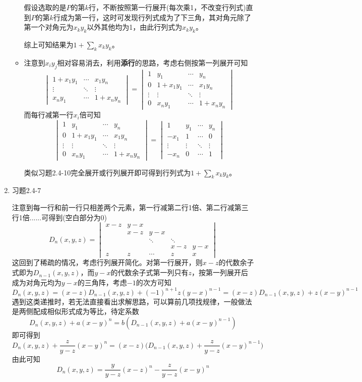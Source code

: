 \documentclass[a4paper,UTF8,fontset=windows]{ctexart}
\begin{document}
\begin{enumerate}
\begin{itemize}
        假设选取的是$P$的第$k$行，不断按照第一行展开(每次乘1，不改变行列式)直到$P$的第$k$行成为第一行，这时可发现行列式成为了下三角，其对角元除了第一个对角元为$x_ky_k$以外其他均为1，由此行列式为$x_ky_k$。

        综上可知结果为$1+\sum_kx_ky_k$。

        \item 注意到$x_iy_j$相对容易消去，利用\textbf{添行}的思路，考虑右侧按第一列展开可知
        $$\begin{vmatrix}1+x_1y_1&\cdots&x_1y_n\\\vdots&\ddots&\vdots\\x_ny_1&\cdots&1+x_ny_n\end{vmatrix}=\begin{vmatrix}1&y_1&\cdots&y_n\\0&1+x_1y_1&\cdots&x_1y_n\\\vdots&\vdots&\ddots&\vdots\\0&x_ny_1&\cdots&1+x_ny_n\end{vmatrix}$$
        而每行减第一行$x_i$倍可知
        $$\begin{vmatrix}1&y_1&\cdots&y_n\\0&1+x_1y_1&\cdots&x_1y_n\\\vdots&\vdots&\ddots&\vdots\\0&x_ny_1&\cdots&1+x_ny_n\end{vmatrix}=\begin{vmatrix}1&y_1&\cdots&y_n\\-x_1&1&\cdots&0\\\vdots&\vdots&\ddots&\vdots\\-x_n&0&\cdots&1\end{vmatrix}$$

        类似习题2.4-10完全展开或行列展开即可得到行列式为$1+\sum_kx_ky_k$。
    \end{itemize}

    \item 习题2.4-7
    
    注意到每一行和前一行只相差两个元素，第一行减第二行1倍、第二行减第三行1倍......可得到(空白部分为0)
    $$D_n(x,y,z)=\begin{vmatrix}x-z&y-x\\ &x-z&y-x\\ &&\ddots&\ddots\\ &&&x-z&y-x\\z&z&\cdots&z&x\end{vmatrix}$$
    这回到了稀疏的情况，考虑行列展开简化。对第一行展开，则$x-z$的代数余子式即为$D_{n-1}(x,y,z)$，而$y-x$的代数余子式第一列只有$z$，按第一列展开后成为对角元均为$y-x$的三角阵，考虑$-1$的次方可知
    $$D_n(x,y,z)=(x-z)D_{n-1}(x,y,z)+(-1)^{n+1}z(y-x)^{n-1}=(x-z)D_{n-1}(x,y,z)+z(x-y)^{n-1}$$
    遇到这类递推时，若无法直接看出求解思路，可以算前几项找规律，一般做法是两侧配成相似形式成为等比，待定系数
    $$D_n(x,y,z)+a(x-y)^n=b(D_{n-1}(x,y,z)+a(x-y)^{n-1})$$
    即可得到
    $$D_n(x,y,z)+\frac{z}{y-z}(x-y)^n=(x-z)\bigg(D_{n-1}(x,y,z)+\frac{z}{y-z}(x-y)^{n-1}\bigg)$$
    由此可知
    $$D_n(x,y,z)=\frac{y}{y-z}(x-z)^n-\frac{z}{y-z}(x-y)^n$$


\end{enumerate}
\end{document}
